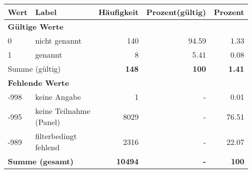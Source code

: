      \begin{longtable}{lXrrr}
     \toprule
     \textbf{Wert} & \textbf{Label} & \textbf{Häufigkeit} & \textbf{Prozent(gültig)} & \textbf{Prozent} \\
     \endhead
     \midrule
     \multicolumn{5}{l}{\textbf{Gültige Werte}}\\

     0 &
     \multicolumn{1}{X}{ nicht genannt   } &


       \num{140} &
       \num[round-mode=places,round-precision=2]{94,59} &
         \num[round-mode=places,round-precision=2]{1,33} \\

     1 &
     \multicolumn{1}{X}{ genannt   } &


       \num{8} &
       \num[round-mode=places,round-precision=2]{5,41} &
         \num[round-mode=places,round-precision=2]{0,08} \\
     \midrule
     \multicolumn{2}{l}{Summe (gültig)} &
       \textbf{\num{148}} &
     \textbf{100} &
       \textbf{\num[round-mode=places,round-precision=2]{1,41}} \\
     \multicolumn{5}{l}{\textbf{Fehlende Werte}}\\
       -998 &
       keine Angabe &
         \num{1} &
        - &
         \num[round-mode=places,round-precision=2]{0,01} \\
       -995 &
       keine Teilnahme (Panel) &
         \num{8029} &
        - &
         \num[round-mode=places,round-precision=2]{76,51} \\
       -989 &
       filterbedingt fehlend &
         \num{2316} &
        - &
         \num[round-mode=places,round-precision=2]{22,07} \\
     \midrule
     \multicolumn{2}{l}{\textbf{Summe (gesamt)}} &
          \textbf{\num{10494}} &
        \textbf{-} &
        \textbf{100} \\
     \bottomrule
     \end{longtable}
     
